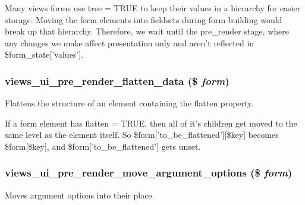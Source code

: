 Many views forms use tree = TRUE to keep their values in a hierarchy for easier storage. Moving the form elements into fieldsets during form building would break up that hierarchy. Therefore, we wait until the pre\_\-render stage, where any changes we make affect presentation only and aren't reflected in \$form\_\-state\mbox{[}'values'\mbox{]}. \hypertarget{admin_8inc_a64b5ca8b414d5900230580914e518a39}{
\subsubsection[{views\_\-ui\_\-pre\_\-render\_\-flatten\_\-data}]{\setlength{\rightskip}{0pt plus 5cm}views\_\-ui\_\-pre\_\-render\_\-flatten\_\-data (\$ {\em form})}}
\label{admin_8inc_a64b5ca8b414d5900230580914e518a39}
Flattens the structure of an element containing the flatten property.

If a form element has flatten = TRUE, then all of it's children get moved to the same level as the element itself. So \$form\mbox{[}'to\_\-be\_\-flattened'\mbox{]}\mbox{[}\$key\mbox{]} becomes \$form\mbox{[}\$key\mbox{]}, and \$form\mbox{[}'to\_\-be\_\-flattened'\mbox{]} gets unset. \hypertarget{admin_8inc_a994257090e927793bf4b762d505191ef}{
\subsubsection[{views\_\-ui\_\-pre\_\-render\_\-move\_\-argument\_\-options}]{\setlength{\rightskip}{0pt plus 5cm}views\_\-ui\_\-pre\_\-render\_\-move\_\-argument\_\-options (\$ {\em form})}}
\label{admin_8inc_a994257090e927793bf4b762d505191ef}
Moves argument options into their place.

